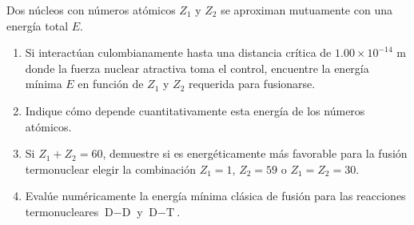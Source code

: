 \item Dos núcleos con números atómicos $Z_1$ y $Z_2$ se aproximan mutuamente con una energía total $E$.
\begin{enumerate}
    \item Si interactúan culombianamente hasta una distancia crítica de $1.00 \times 10^{-14}\text{ m}$ donde la fuerza nuclear atractiva toma el control, encuentre la energía mínima $E$ en función de $Z_1$ y $Z_2$ requerida para fusionarse.
    \item Indique cómo depende cuantitativamente esta energía de los números atómicos.
    \item Si $Z_1 + Z_2 = 60$, demuestre si es energéticamente más favorable para la fusión termonuclear elegir la combinación $Z_1 = 1$, $Z_2 = 59$ o $Z_1 = Z_2 = 30$.
    \item Evalúe numéricamente la energía mínima clásica de fusión para las reacciones termonucleares $\text{D}-\text{D}$ y $\text{D}-\text{T}$.
\end{enumerate}